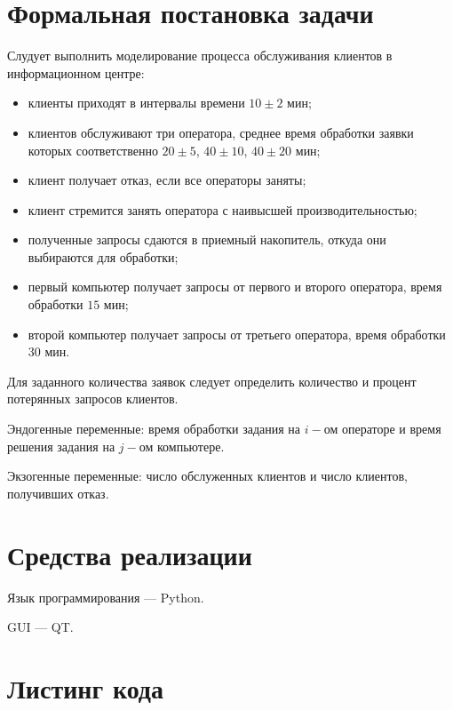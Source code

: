 \section*{Формальная постановка задачи}


Слудует выполнить моделирование процесса обслуживания клиентов в информационном центре:
\begin{itemize}
	\item клиенты приходят в интервалы времени $10\pm2$ мин;
	\item клиентов обслуживают три оператора, среднее время обработки заявки которых соответственно $20\pm5$, $40\pm10$, $40\pm20$ мин;
	\item клиент получает отказ, если все операторы заняты;
	\item клиент стремится занять оператора с наивысшей производительностью;
	\item полученные запросы сдаются в приемный накопитель, откуда они выбираются для обработки;
	\item первый компьютер получает запросы от первого и второго оператора, время обработки $15$ мин;
	\item второй компьютер получает запросы от третьего оператора, время обработки $30$ мин.
\end{itemize}

Для заданного количества заявок следует определить количество и процент потерянных запросов клиентов.

Эндогенные переменные: время обработки задания на $i-$ом операторе и время решения задания на $j-$ом компьютере.

Экзогенные переменные: число обслуженных клиентов и число клиентов, получивших отказ.

\section*{Средства реализации}

Язык программирования --- Python.

GUI --- QT.

\clearpage

\section*{Листинг кода}

